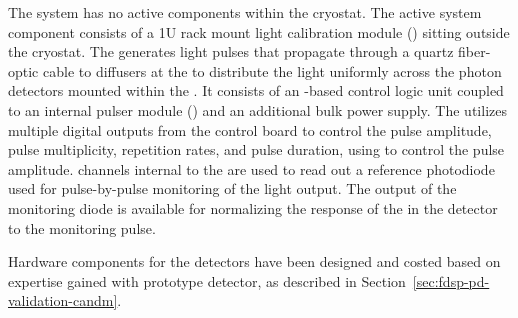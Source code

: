 

The system has no active components within the cryostat. The active system component consists of a 1U rack mount light calibration module () sitting outside the cryostat. The  generates light pulses that propagate through a quartz fiber-optic cable to diffusers at the  to distribute the light uniformly across the photon detectors mounted within the . 
It consists of an -based control logic unit coupled to an internal  pulser module () and an additional bulk power supply. 
The  utilizes multiple digital outputs from the control board to control the pulse amplitude, pulse multiplicity, repetition rates, and pulse duration, using  to control the  pulse amplitude.  channels internal to the  are used to read out a reference photodiode used for pulse-by-pulse monitoring of the  light output. The output of the monitoring diode is available for normalizing the response of the  in the detector to the monitoring pulse. 

Hardware components for the  detectors have been designed and costed based on expertise gained with  prototype detector, as described in Section~\ref{sec:fdsp-pd-validation-candm}.



